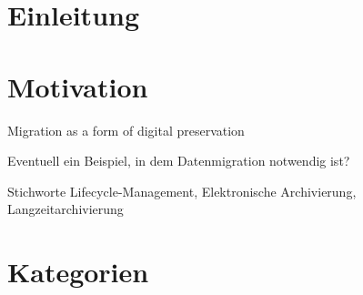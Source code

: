 \documentclass[11pt]{scrartcl}
\newif\iffull
\begin{document}
	
\iffull
\title{Data Migration} 

\subtitle{Untertitel}

\date{Modul Software Reengineering 2015/2016\\
  \small Fachbereich Informatik\\ 
  Arbeitsbereich Softwarekonstruktion \& Werkzeuge\\ 
  Universit"at Hamburg\\[4mm]
  \today}

\maketitle

\begin{abstract}
	\small\noindent\textbf{Abstract}

	\noindent Abstract 
\end{abstract}

\newpage
\tableofcontents
\newpage

\fi



\section{Einleitung}

\section{Motivation}

Migration as a form of digital preservation

Eventuell ein Beispiel, in dem Datenmigration notwendig ist?

Stichworte Lifecycle-Management, Elektronische Archivierung, Langzeitarchivierung

\section{Kategorien}
\end{document}
